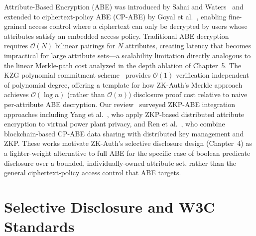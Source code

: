 \documentclass[12pt,a4paper,oneside]{report}
\begin{document}
Attribute-Based Encryption (ABE) was introduced by Sahai and
Waters~\cite{sahai05} and extended to ciphertext-policy ABE (CP-ABE) by
Goyal et al.~\cite{goyal06}, enabling fine-grained access control where a
ciphertext can only be decrypted by users whose attributes satisfy an
embedded access policy. Traditional ABE decryption requires
$\mathcal{O}(N)$ bilinear pairings for $N$ attributes, creating latency
that becomes impractical for large attribute sets---a scalability
limitation directly analogous to the linear Merkle-path cost analyzed in
the depth ablation of Chapter~5. The KZG polynomial commitment
scheme~\cite{kate10} provides $\mathcal{O}(1)$ verification independent of
polynomial degree, offering a template for how ZK-Auth's Merkle approach
achieves $\mathcal{O}(\log n)$ (rather than $\mathcal{O}(n)$) disclosure
proof cost relative to naive per-attribute ABE decryption. Our
review~\cite{prasad2025abereview} surveyed ZKP-ABE integration approaches
including Yang et al.~\cite{yang2024}, who apply ZKP-based distributed
attribute encryption to virtual power plant privacy, and Ren et
al.~\cite{ren2024}, who combine blockchain-based CP-ABE data sharing with
distributed key management and ZKP. These works motivate ZK-Auth's
selective disclosure design (Chapter~4) as a lighter-weight alternative to
full ABE for the specific case of boolean predicate disclosure over a
bounded, individually-owned attribute set, rather than the general
ciphertext-policy access control that ABE targets.

\section{Selective Disclosure and W3C Standards}
\end{document}
